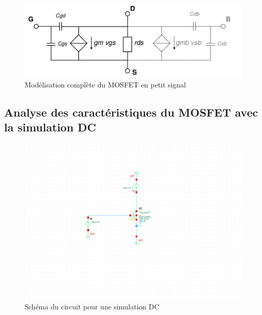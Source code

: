 \documentclass[a4paper]{article}
\begin{document}
\begin{figure}[!htb]
\begin{center}
  \includegraphics[scale=0.47]{complete-model.png}
  \caption{Mod\'elisation compl\`ete du MOSFET en petit signal\cite{conception-circuits-integrees}}
\end{center}
\end{figure}

\subsection{Analyse des caract\'eristiques du MOSFET avec la simulation DC}

\begin{figure}[!htb]
\begin{center}
  \includegraphics[scale=0.40]{arch-transistor.png}
  \caption{Sch\'ema du circuit pour une simulation DC}
\end{center}
\end{figure}
\end{document}
